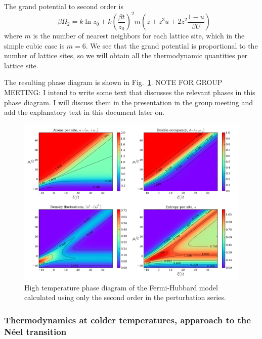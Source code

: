 \documentclass[oneside,11pt]{memoir}
\begin{document}
The grand potential to second order is~\cite{Henderson1992,Jordens2010} 
\begin{equation}
-\beta \Omega_{2} = k \ln z_{0} + k \left( \frac{\beta t }{z_{0}} \right)^{2} m 
        \left( z + z^{3} u + 2z^{2} \frac{1-u}{\beta U} \right) 
\end{equation} 
where $m$ is the number of nearest neighbors for each lattice site, which in
the simple cubic case is $m=6$.  We see that the grand potential is
proportional to the number of lattice sites, so we will obtain all the
thermodynamic quantities per lattice site. 

The resulting phase diagram is shown in Fig.~\ref{fig:highTphases}.  NOTE FOR
GROUP MEETING:  I intend to write some text that discusses the relevant phases
in this phase diagram.  I will discuss them in the presentation in the group
meeting and add the explanatory text in this document later on.  
\begin{figure}
\centering \includegraphics[width=\textwidth]{../figures/HubbardPhaseDiagram_figures/HTSE_phasesT025.png}
\caption[High temperature phase diagram of the Fermi-Hubbard model]{\small 
High temperature phase diagram of the Fermi-Hubbard model calculated using only the second order in the perturbation series. 
} \label{fig:highTphases}
\end{figure}

\subsubsection{Thermodynamics at colder temperatures, apparoach to the N\'{e}el transition}
\end{document}
